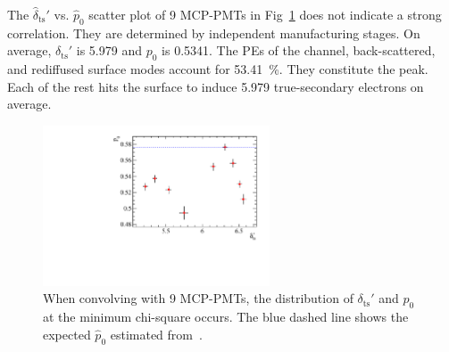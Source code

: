 The $\hat{\delta}_{\mathrm{ts}}'$ vs. $\hat{p}_0$ scatter plot
of 9 MCP-PMTs in Fig~\ref{fig:true_p} does not indicate a strong correlation.
They are determined by independent manufacturing stages.
On average, $\delta_{\mathrm{ts}}'$ is 5.979 and $p_0$ is 0.5341. %
The PEs of the channel, back-scattered, and rediffused surface modes account for \SI{53.41}{\percent}.
They constitute the peak. Each of the rest hits the surface
to induce 5.979 true-secondary electrons on average.

\begin{figure}[!htbp]
	\centering
	\includegraphics[width=0.6\textwidth]{PMTRelated/GTmodel/true_p.pdf}
	\caption{When convolving with 9 MCP-PMTs,
		the distribution of $\delta_{\mathrm{ts}}'$ and $p_0$ at the minimum chi-square
		occurs. The blue dashed line shows the expected $\hat{p}_0$ estimated from~\cite{chen2018photoelectron}.}
	\label{fig:true_p}
\end{figure}

